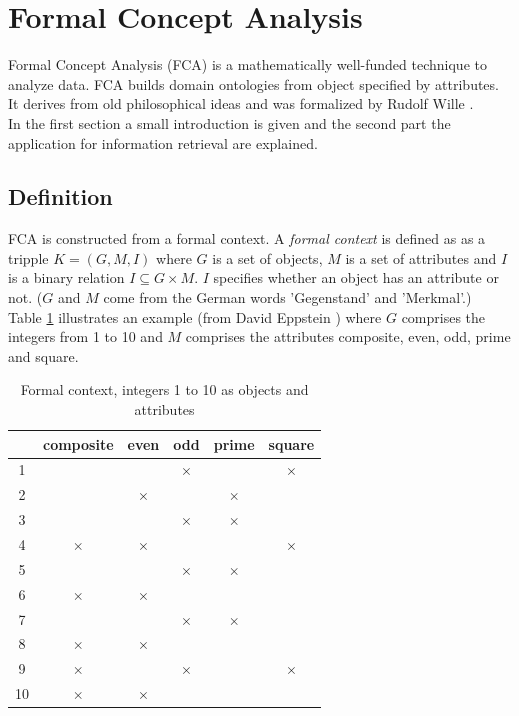 \documentclass[11pt]{report}
\begin{document}
\section{Formal Concept Analysis}

Formal Concept Analysis (FCA) is a mathematically well-funded technique to analyze data. FCA builds domain ontologies from object specified by attributes. It derives from old philosophical ideas and was formalized by Rudolf Wille \cite{Ganter2012}. \\

In the first section a small introduction is given and the second part the application for information retrieval are explained.

\subsection{Definition}

FCA is constructed from a formal context. A \textit{formal context} is defined as as a tripple $K = (G, M, I)$ where $G$ is a set of objects, $M$ is a set of attributes and $I$ is a binary relation $I \subseteq G \times M$. $I$ specifies whether an object has an attribute or not. ($G$ and $M$ come from the German words 'Gegenstand' and 'Merkmal'.) \\

Table \ref{table:example} illustrates an example (from David Eppstein \cite{fcaexample}) where $G$ comprises the integers from 1 to 10 and $M$ comprises the attributes composite, even, odd, prime and square. \\


\begin{table}[h]
\caption{Formal context, integers 1 to 10 as objects and attributes}
\label{table:example}
\centering

\def\arraystretch{1.2}%
\begin{tabular}{ | c | c c c c c |}
\hline
  & composite & even & odd & prime & square\\
\hline

1 & & & $\times$ & &$\times$\\ 
2 & & $\times$ & & $\times$ &\\
3 & & & $\times$ & $\times$ &\\ 
4 & $\times$ & $\times$ & & & $\times$\\
5 & & & $\times$ & $\times$ &\\
6 & $\times$ & $\times$ & & &\\
7 & & & $\times$ & $\times$ &\\ 
8 & $\times$ & $\times$ & & &\\
9 & $\times$ & & $\times$ & & $\times$\\
10 & $\times$ & $\times$ & & &\\ \hline


\end{tabular}
\end{table}
\end{document}
